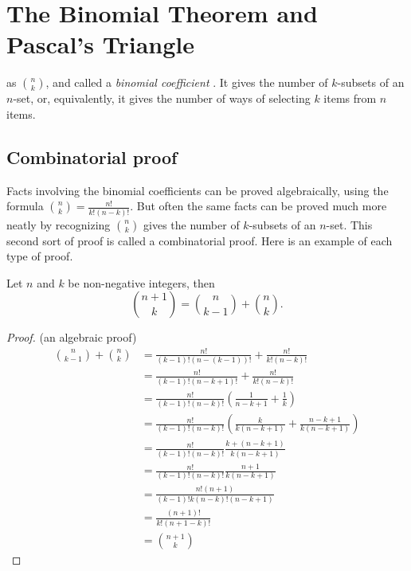 \chapter{The Binomial Theorem and Pascal's Triangle}

 as $\displaystyle \binom{n}{k}$, and called a {\it binomial 
coefficient} . It gives the number of $k$-subsets of an $n$-set, or, equivalently, it gives
the number of ways of selecting $k$ items from $n$ items. 

\section{Combinatorial proof}
Facts involving the binomial coefficients can  be proved algebraically, using the
formula $\displaystyle \binom{n}{k} = {\frac{n!}{k!(n-k)!}}$. But often the same facts can be
proved much more neatly by recognizing   $\displaystyle \binom{n}{k}$ gives the number
of $k$-subsets of an $n$-set. This second sort of proof is called a combinatorial
proof. Here is an example of each type of proof.

\begin{thm}\label{thrm:Pascal's Id}
 Let $n$ and $k$ be non-negative integers, then
\[
\binom{n+1}{k}=\binom{n}{k-1}+\binom{n}{k}.
\]
\end{thm}
\begin{proof}(an algebraic proof) 
\begin{align*}
  {n\choose k-1}+{n\choose k}&= {\frac{n!}{(k-1)!(n-(k-1))!}}+ {\frac{n!}{k!(n-k)!}} \\
 &=  {\frac{n!}{(k-1)!(n-k+1)!}}+ {\frac{n!}{k!(n-k)!}} \\
 &= {\frac{n!}{(k-1)!(n-k)!}}\left(\frac{1}{n-k+1}+ \frac{1}{k}\right) \\
 &=  {\frac{n!}{(k-1)!(n-k)!}}\left(\frac{k}{k(n-k+1)}+ {\frac{n-k+1}{k(n-k+1)}}\right) \\
 &=  {\frac{n!}{(k-1)!(n-k)!}}{\frac{k+(n-k+1)}{k(n-k+1)}} \\
 &= {\frac{n!}{(k-1)!(n-k)!}}{\frac{n+1}{k(n-k+1)}} \\
 &= {\frac{n!(n+1)}{(k-1)!k(n-k)!(n-k+1)}} \\
 &= {\frac{(n+1)!}{k!(n+1-k)!}} \\
 &= {{n+1}\choose k}
\end{align*}
\end{proof}

